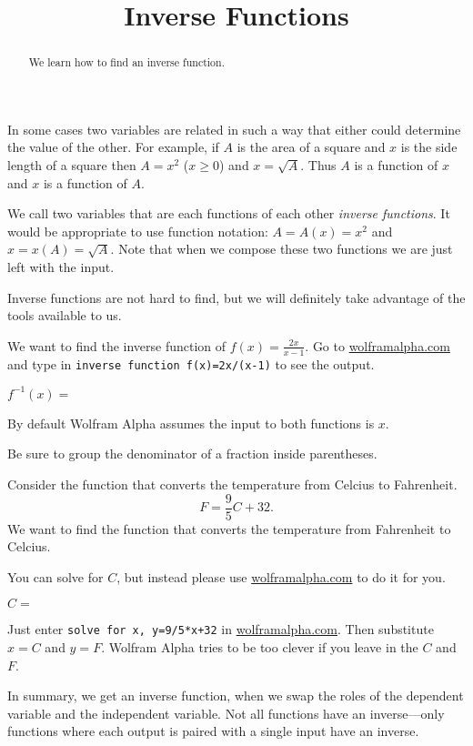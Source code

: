 \documentclass{ximera}
\title{Inverse Functions}
\begin{document}
\begin{abstract}
We learn how to find an inverse function.
\end{abstract}
\maketitle

In some cases two variables are related in such a way that either could determine the value of the other. For example, if $A$ is the area of a square and $x$ is the side length of a square then $A=x^2$ ($x\ge0$) and $x=\sqrt{A}$. Thus $A$ is a function of $x$ and $x$ is a function of $A$.

We call two variables that are each functions of each other \emph{inverse functions}. It would be appropriate to use function notation: $A=A(x)=x^2$ and $x=x(A)=\sqrt{A}$. Note that when we compose these two functions we are just left with the input. 

Inverse functions are not hard to find, but we will definitely take advantage of the tools available to us. 

\begin{question}
We want to find the inverse function of $f(x)=\frac{2x}{x-1}$.
Go to \url{wolframalpha.com} and type in \verb|inverse function f(x)=2x/(x-1)| to see the output.
\begin{solution}
$f^{-1}(x)=$ 
\begin{hint}
By default Wolfram Alpha assumes the input to both functions is $x$.
\end{hint}
\begin{hint}
Be sure to group the denominator of a fraction inside parentheses.
\end{hint}
\end{solution}
\end{question}



\begin{question}
Consider the function that converts the temperature from Celcius to Fahrenheit. 
\[
F=\frac{9}{5}C+32.
\]
We want to find the function that converts the temperature from Fahrenheit to Celcius.

You can solve for $C$, but instead please use \url{wolframalpha.com} to do it for you.

\begin{solution}
$C=$ 
\begin{hint}
Just enter \verb|solve for x, y=9/5*x+32| in \url{wolframalpha.com}. Then substitute $x=C$ and $y=F$. Wolfram Alpha tries to be too clever if you leave in the $C$ and $F$.
\end{hint}
\end{solution}

In summary, we get an inverse function, when we swap the roles of the dependent variable and the independent variable. Not all functions have an inverse---only functions where each output is paired with a single input have an inverse.
\end{question}
\end{document}
